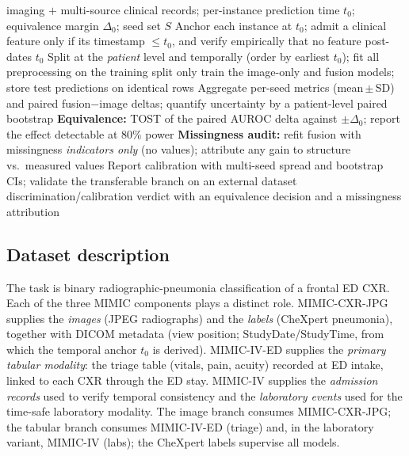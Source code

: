 \documentclass[twocolumn, final]{svjour3}
\begin{document}
\begin{algorithm}[t]
\caption{TEMPO: time-safe, equivalence-tested, missingness-audited evaluation of
clinical multimodal fusion.}
\label{alg:tempo}
\begin{algorithmic}[1]
\Require imaging $+$ multi-source clinical records; per-instance prediction time
$t_0$; equivalence margin $\Delta_0$; seed set $S$
\State Anchor each instance at $t_0$; admit a clinical feature only if its timestamp
$\le t_0$, and verify empirically that no feature post-dates $t_0$ 
\State Split at the \emph{patient} level and temporally (order by earliest $t_0$); fit
all preprocessing on the training split only
  \State train the image-only and fusion models; store test predictions on identical rows
\EndFor
\State Aggregate per-seed metrics (mean\,$\pm$\,SD) and paired fusion$-$image deltas;
quantify uncertainty by a patient-level paired bootstrap
\State \textbf{Equivalence:} TOST of the paired AUROC delta against $\pm\Delta_0$;
report the effect detectable at 80\% power
\State \textbf{Missingness audit:} refit fusion with missingness \emph{indicators only}
(no values); attribute any gain to structure vs.\ measured values
\State Report calibration with multi-seed spread and bootstrap CIs; validate the
transferable branch on an external dataset
\Ensure discrimination/calibration verdict with an equivalence decision and a
missingness attribution
\end{algorithmic}
\end{algorithm}

\subsection{Dataset description}
\label{subsec:datasets}
The task is binary radiographic-pneumonia classification of a frontal ED CXR. Each
of the three MIMIC components plays a distinct role. MIMIC-CXR-JPG supplies the
\emph{images} (JPEG radiographs) and the \emph{labels} (CheXpert pneumonia), together
with DICOM metadata (view position; StudyDate/StudyTime, from which the temporal
anchor $t_0$ is derived). MIMIC-IV-ED supplies the \emph{primary tabular modality}:
the triage table (vitals, pain, acuity) recorded at ED intake, linked to each CXR
through the ED stay. MIMIC-IV supplies the \emph{admission records} used to verify
temporal consistency and the \emph{laboratory events} used for the time-safe
laboratory modality. The image branch consumes MIMIC-CXR-JPG; the tabular branch
consumes MIMIC-IV-ED (triage) and, in the laboratory variant, MIMIC-IV (labs); the
CheXpert labels supervise all models.
\end{document}
